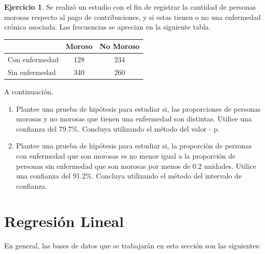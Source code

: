 \documentclass[
  11pt,
]{book}
\theoremstyle{definition}
\theoremstyle{definition}
\theoremstyle{definition}
\newtheorem{exercise}{Ejercicio}[chapter]
\theoremstyle{definition}
\theoremstyle{remark}
\begin{document}
\begin{exercise}

Se realizó un estudio con el fin de registrar la cantidad de personas morosas respecto al pago de contribuciones, y si estas tienen o no una enfermedad crónica asociada. Las frecuencias se aprecian en la siguiente tabla.

\begin{table}[H]
\centering
\begin{tabular}[t]{lcc}
\toprule
  & Moroso & No Moroso\\
\midrule
Con enfermedad & 128 & 234\\
Sin enfermedad & 340 & 260\\
\bottomrule
\end{tabular}
\end{table}

A continuación.

\begin{enumerate}
\def\labelenumi{\arabic{enumi}.}
\item
  Plantee una prueba de hipótesis para estudiar si, las proporciones de personas morosas y no morosas que tienen una enfermedad son distintas. Utilice una confianza del 79.7\%. Concluya utilizando el método del valor - p.
\item
  Plantee una prueba de hipótesis para estudiar si, la proporción de personas con enfermedad que son morosas es no menor igual a la proporción de personas sin enfermedad que son morosas por menos de 0.2 unidades. Utilice una confianza del 91.2\%. Concluya utilizando el método del intervalo de confianza.
\end{enumerate}

\end{exercise}

\chapter{Regresión Lineal}\label{regresiuxf3n-lineal}

En general, las bases de datos que se trabajarán en esta sección son las siguientes:
\end{document}
